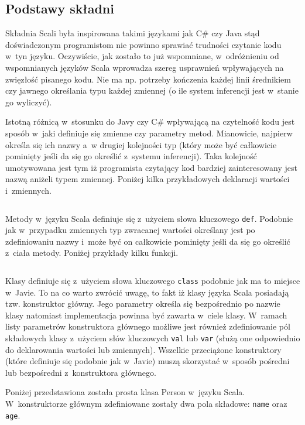 \documentclass[brudnopis]{xmgr}
\begin{document}
\subsection{Podstawy składni}
Składnia Scali była inspirowana takimi językami jak C\# czy Java stąd doświadczonym programistom nie powinno sprawiać trudności czytanie kodu w~tyn języku. Oczywiście, jak zostało to już wspomniane, w~odróżnieniu od wspomnianych języków Scala wprowadza szereg usprawnień wpływających na zwięzłość pisanego kodu. Nie ma np. potrzeby kończenia każdej linii średnikiem czy jawnego określania typu każdej zmiennej (o ile system inferencji jest w~stanie go wyliczyć).

Istotną różnicą w~stosunku do Javy czy C\# wpływającą na czytelność kodu jest sposób w~jaki definiuje się zmienne czy parametry metod. Mianowicie, najpierw określa się ich nazwy a~w drugiej kolejności typ (który może być całkowicie pominięty jeśli da się go określić z~systemu inferencji). Taka kolejność umotywowana jest tym iż programista czytający kod bardziej zainteresowany jest nazwą aniżeli typem zmiennej. Poniżej kilka przykładowych deklaracji wartości i~zmiennych.

\inputminted{scala}{listings/scala/val-var-declarations.scala}

Metody w~języku Scala definiuje się z~użyciem słowa kluczowego \texttt{def}. Podobnie jak w~przypadku zmiennych typ zwracanej wartości określany jest po zdefiniowaniu nazwy i~może być on całkowicie pominięty jeśli da się go określić z~ciała metody. Poniżej przykłady kilku funkcji.

\inputminted{scala}{listings/scala/functions-example.scala}

Klasy definiuje się z~użyciem słowa kluczowego \texttt{class} podobnie jak ma to miejsce w~Javie. To na co warto zwrócić uwagę, to fakt iż klasy języka Scala posiadają tzw. konstruktor główny. Jego parametry określa się bezpośrednio po nazwie klasy natomiast implementacja powinna być zawarta w~ciele klasy. W~ramach listy parametrów konstruktora głównego możliwe jest również zdefiniowanie pól składowych klasy z~użyciem słów kluczowych \texttt{val} lub \texttt{var} (służą one odpowiednio do deklarowania wartości lub zmiennych). Wszelkie przeciążone konstruktory (które definiuje się podobnie jak w~Javie) muszą skorzystać w~sposób pośredni lub bezpośredni z~konstruktora głównego.

Poniżej przedstawiona została prosta klasa Person w~języku Scala. W~konstruktorze głównym zdefiniowane zostały dwa pola składowe: \texttt{name} oraz \texttt{age}.
\end{document}
